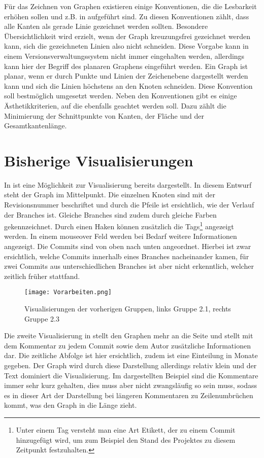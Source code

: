 \documentclass[color]{tudbook}
\begin{document}
Für das Zeichnen von Graphen existieren einige Konventionen, die die Lesbarkeit erhöhen sollen und z.B. in \cite{Aesthetik} aufgeführt sind. Zu diesen Konventionen zählt, dass alle Kanten als gerade Linie gezeichnet werden sollten. Besondere Übersichtlichkeit wird erzielt, wenn der Graph kreuzungsfrei gezeichnet werden kann, sich die gezeichneten Linien also nicht schneiden. Diese Vorgabe kann in einem Versionsverwaltungssystem nicht immer eingehalten werden, allerdings kann hier der Begriff des planaren Graphens eingeführt werden. Ein Graph ist planar, wenn er durch Punkte und Linien der Zeichenebene dargestellt werden kann und sich die Linien höchstens an den Knoten schneiden. Diese Konvention soll bestmöglich umgesetzt werden. Neben den Konventionen gibt es einige Ästhetikkriterien, auf die ebenfalls geachtet werden soll. Dazu zählt die Minimierung der Schnittpunkte von Kanten, der Fläche und der Gesamtkantenlänge.

\section{Bisherige Visualisierungen}
In \cite{Gruppe2.1} ist eine Möglichkeit zur Visualisierung bereits dargestellt. In diesem Entwurf steht der Graph im Mittelpunkt. Die einzelnen Knoten sind mit der Revisionsnummer beschriftet und durch die Pfeile ist ersichtlich, wie der Verlauf der Branches ist. Gleiche Branches sind zudem durch gleiche Farben gekennzeichnet. Durch einen Haken können zusätzlich die Tags\footnote{Unter einem Tag versteht man eine Art Etikett, der zu einem Commit hinzugefügt wird, um zum Beispiel den Stand des Projektes zu diesem Zeitpunkt festzuhalten.} angezeigt werden. In einem mouseover Feld werden bei Bedarf weitere Informationen angezeigt. Die Commits sind von oben nach unten angeordnet. Hierbei ist zwar ersichtlich, welche Commits innerhalb eines Branches nacheinander kamen, für zwei Commits aus unterschiedlichen Branches ist aber nicht erkenntlich, welcher zeitlich früher stattfand.

\begin{figure}[htbp] 
  \centering
     \texttt{[image: Vorarbeiten.png]}
  \caption[Visualisierungen der vorherigen Gruppen, links Gruppe 2.1 (aus \cite{Gruppe2.1}), rechts Gruppe 2.3 (aus \cite{Gruppe2.3})]{Visualisierungen der vorherigen Gruppen, links Gruppe 2.1, rechts Gruppe 2.3}
  \label{fig:Vorarbeiten}
\end{figure}

Die zweite Visualisierung in \cite{Gruppe2.3} stellt den Graphen mehr an die Seite und stellt mit dem Kommentar zu jedem Commit sowie dem Autor zusätzliche Informationen dar. Die zeitliche Abfolge ist hier ersichtlich, zudem ist eine Einteilung in Monate gegeben. Der Graph wird durch diese Darstellung allerdings relativ klein und der Text dominiert die Visualisierung. Im dargestellten Beispiel sind die Kommentare immer sehr kurz gehalten, dies muss aber nicht zwangsläufig so sein muss, sodass es in dieser Art der Darstellung bei längeren Kommentaren zu Zeilenumbrüchen kommt, was den Graph in die Länge zieht.  
\end{document}
